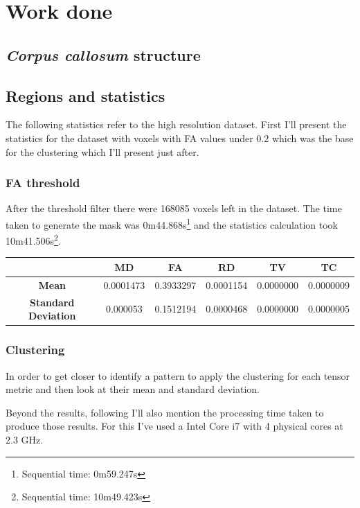 \documentclass[a4paper,11pt]{report}
\begin{document}
\chapter{Work done}

  \section{\textit{Corpus callosum} structure}

  \section{Regions and statistics}
  The following statistics refer to the high resolution dataset. First I'll present the statistics for the dataset with voxels with FA values under 0.2 which was the base for the clustering which I'll present just after.

    \subsection{FA threshold}\label{subsec:fa-threshold}
    After the threshold filter there were 168085 voxels left in the dataset. The time taken to generate the mask was 0m44.868s\footnote{Sequential time: 0m59.247s} and the statistics calculation took 10m41.506s\footnote{Sequential time: 10m49.423s}.

    \begin{tabular}{| c | c | c | c | c | c |}
      \hline
        & \textbf{MD} & \textbf{FA} & \textbf{RD} & \textbf{TV} & \textbf{TC} \\ \hline
       \textbf{Mean} & 0.0001473 & 0.3933297 & 0.0001154 & 0.0000000 & 0.0000009 \\ \hline
       \textbf{Standard Deviation} & 0.000053 & 0.1512194 & 0.0000468 & 0.0000000 & 0.0000005 \\ \hline 
    \end{tabular}

    \subsection{Clustering}\label{subsec:clustering}
    In order to get closer to identify a pattern to apply the clustering for each tensor metric and then look at their mean and standard deviation.

    Beyond the results, following I'll also mention the processing time taken to produce those results. For this I've used a Intel Core i7 with 4 physical cores at 2.3 GHz.
\end{document}
